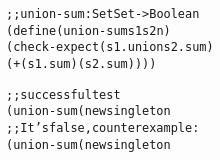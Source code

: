\documentclass[12pt]{article}                   %
\newenvironment{solution}{\color{Red}}{}
\begin{document}
\begin{problem}
\begin{enumerate}
\end{enumerate}

\begin{solution}
\begin{alltt}
;; union-sum : Set Set -> Boolean
(define (union-sum s1 s2 n)
  (check-expect (s1 . union s2 . sum)
                (+ (s1 . sum) (s2 . sum))))

;; successful test
(union-sum (new singleton% 17) e)
;; It's false, counterexample:
(union-sum (new singleton% 17) (new singleton% 17))
\end{alltt}
\end{solution}

\newpage
\ifrubric{}
\newpage
\fi
\end{problem}


\newpage


\end{document}
